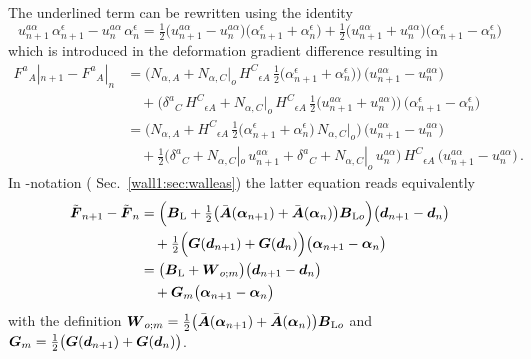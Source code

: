 The underlined term can be rewritten using the identity
\begin{equation}
   u^{a\alpha}_{n+1} \, \alpha^\epsilon_{n+1} 
     - u^{a\alpha}_{n} \, \alpha^\epsilon_{n}
   = \tfrac{1}{2} \big( u^{a\alpha}_{n+1} - u^{a\alpha}_n \big)
     \big( \alpha^\epsilon_{n+1} + \alpha^\epsilon_{n} \big)
   + \tfrac{1}{2} \big( u^{a\alpha}_{n+1} + u^{a\alpha}_n \big)
     \big( \alpha^\epsilon_{n+1} - \alpha^\epsilon_{n} \big)
\end{equation}
which is introduced in the deformation gradient difference resulting in
\begin{equation}
\begin{split}
   F^a{}_A|_{n+1} - F^a{}_A|_{n}
&  = \Big( N_{\alpha,A} + N_{\alpha,C}|_o \, H^C{}_{\epsilon A}
           \, \tfrac{1}{2} \big( \alpha^\epsilon_{n+1} 
                                 + \alpha^\epsilon_{n} \big) \Big)
     \, \big( u^{a\alpha}_{n+1} - u^{a\alpha}_n \big)
\\
&\quad + \Big( \delta^a{}_C \, H^C{}_{\epsilon A}
               + N_{\alpha,C}|_o \, H^C{}_{\epsilon A}
                 \, \tfrac{1}{2} \big( u^{a\alpha}_{n+1} 
                                    + u^{a\alpha}_n \big) \Big)
       \, \big( \alpha^\epsilon_{n+1} - \alpha^\epsilon_{n} \big)
\\
&  = \Big( N_{\alpha,A} + H^C{}_{\epsilon A}
           \, \tfrac{1}{2} \big( \alpha^\epsilon_{n+1} 
                                 + \alpha^\epsilon_{n} \big) \, N_{\alpha,C}|_o \Big)
     \, \big( u^{a\alpha}_{n+1} - u^{a\alpha}_n \big)
\\
&\quad + \tfrac{1}{2} \Big( \delta^a{}_C  
                            + N_{\alpha,C}|_o \, u^{a\alpha}_{n+1}
                            + \delta^a{}_C  
                            + N_{\alpha,C}|_o \, u^{a\alpha}_{n} \Big)
       \, H^C{}_{\epsilon A}
       \, \big( u^{a\alpha}_{n+1} - u^{a\alpha}_n \big)
  \period
\end{split}   
\end{equation}
In -notation (\cf{} Sec.~\ref{wall1:sec:walleas}) the latter
equation reads equivalently
\begin{equation}
\begin{split}
   \tilde{\boldsymbol{F}}_{n+1} - \tilde{\boldsymbol{F}}_n
&  = \Big( \boldsymbol{B}_{\text{L}} + \tfrac{1}{2} \big( \bar{\boldsymbol{A}}(\boldsymbol{\alpha}_{n+1})
   + \bar{\boldsymbol{A}}(\boldsymbol{\alpha}_n) \big) \boldsymbol{B}_{\text{L} o} \Big)
   \big( \boldsymbol{d}_{n+1} - \boldsymbol{d}_n \big)
\\
&\quad
   + \tfrac{1}{2} \Big( \boldsymbol{G}(\boldsymbol{d}_{n+1}) + \boldsymbol{G}(\boldsymbol{d}_n) \Big)
   \big( \boldsymbol{\alpha}_{n+1} - \boldsymbol{\alpha}_n \big)
\\
&  = \big( \boldsymbol{B}_{\text{L}} + \boldsymbol{W}_{o;m} \big)
     \big( \boldsymbol{d}_{n+1} - \boldsymbol{d}_n \big)
\\
&\quad
   + \boldsymbol{G}_m \big( \boldsymbol{\alpha}_{n+1} - \boldsymbol{\alpha}_n \big)
\end{split}
\end{equation}
with the definition $\boldsymbol{W}_{o;m} = \tfrac{1}{2} \big(
\bar{\boldsymbol{A}}(\boldsymbol{\alpha}_{n+1}) + \bar{\boldsymbol{A}}(\boldsymbol{\alpha}_n) \big) \boldsymbol{B}_{\text{L}
o}$  and $\boldsymbol{G}_m = \tfrac{1}{2} \big( \boldsymbol{G}(\boldsymbol{d}_{n+1}) +
\boldsymbol{G}(\boldsymbol{d}_n) \big)$. 

